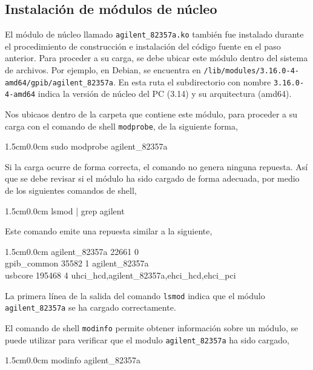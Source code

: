 \documentclass[paper=letter,oneside,fontsize=11pt, parskip=full]{scrartcl}
\newenvironment{code}
	{\begin{adjustwidth}{1.5cm}{0.0cm}\ttfamily}
	{\end{adjustwidth}}
\begin{document}
		\subsection{Instalación de módulos de núcleo}
		
		El módulo de núcleo llamado \texttt{agilent\_82357a.ko} también fue instalado durante el procedimiento de construcción e instalación del código fuente en el paso anterior. Para proceder a su carga, se debe ubicar este módulo dentro del sistema de archivos. Por ejemplo, en Debian, se encuentra en \texttt{/lib/modules/3.16.0-4-amd64/gpib/agilent\_82357a}. En esta ruta el subdirectorio con nombre \texttt{3.16.0-4-amd64} indica la versión de núcleo del PC (3.14) y su arquitectura (amd64). 
		
		Nos ubicaos dentro de la carpeta que contiene este módulo, para proceder a su carga con el comando de shell \texttt{modprobe}, de la siguiente forma,
		
		\begin{code}
			sudo modprobe agilent\_82357a
		\end{code}
		
		Si la carga ocurre de forma correcta, el comando no genera ninguna repuesta. Así que se debe revisar si el módulo ha sido cargado de forma adecuada, por medio de los siguientes comandos de shell,
		
		\begin{code}		
			lsmod | grep agilent
		\end{code}
	
		Este comando emite una repuesta similar a la siguiente,

		\begin{code}
			agilent\_82357a	22661  0 \\				
			gpib\_common	35582  1 agilent\_82357a  \\				
			usbcore	195468  4 uhci\_hcd,agilent\_82357a,ehci\_hcd,ehci\_pci \\
		\end{code}
		
		La primera línea de la salida del comando \texttt{lsmod} indica que el módulo \texttt{agilent\_82357a} se ha cargado correctamente. 	
		
		El comando de shell \texttt{modinfo} permite obtener información sobre un módulo, se puede utilizar para verificar que el modulo \texttt{agilent\_82357a} ha sido cargado, 
		
		\begin{code}
			modinfo agilent\_82357a 			
		\end{code}
		
\end{document}
